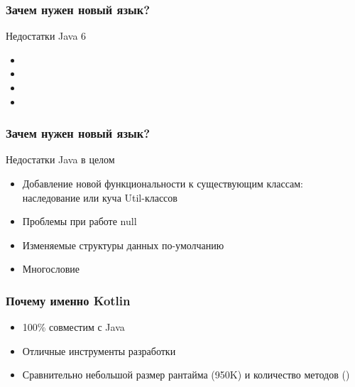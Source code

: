 \documentclass{beamer}
\begin{document}
\begin{frame}
    \frametitle{Зачем нужен новый язык?}
    Недостатки Java 6
    \begin{itemize}
        \item {}
        \item {}
        \item {}
        \item {}
    \end{itemize}
\end{frame}

\begin{frame}
    \frametitle{Зачем нужен новый язык?}
    Недостатки Java в целом
    \begin{itemize}
        \item Добавление новой функциональности к существующим классам:
            наследование или куча Util-классов
        \item Проблемы при работе null
        \item Изменяемые структуры данных по-умолчанию
        \item Многословие
    \end{itemize}
\end{frame}

\begin{frame}
    \frametitle{Почему именно Kotlin}
    \begin{itemize}
        \item 100\% совместим с Java
        \item Отличные инструменты разработки
        \item Сравнительно небольшой размер рантайма (\approx 950K) и количество методов ()
    \end{itemize}
\end{frame}

\begin{frame}
\end{frame}
\end{document}

